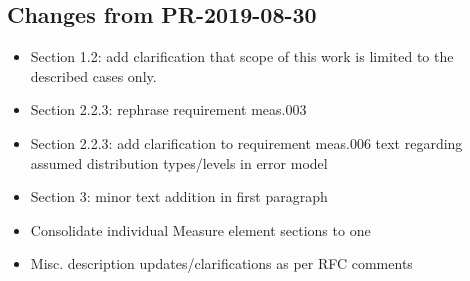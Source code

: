 \documentclass[11pt,a4paper]{ivoa}
\begin{document}
\subsection{Changes from PR-2019-08-30}
\begin{itemize} 
  \item Section 1.2: add clarification that scope of this work is limited to the described cases only.
  \item Section 2.2.3: rephrase requirement meas.003
  \item Section 2.2.3: add clarification to requirement meas.006 text regarding assumed distribution types/levels in error model
  \item Section 3: minor text addition in first paragraph
  \item Consolidate individual Measure element sections to one
  \item Misc. description updates/clarifications as per RFC comments
\end{itemize}





\pagebreak

\end{document}
